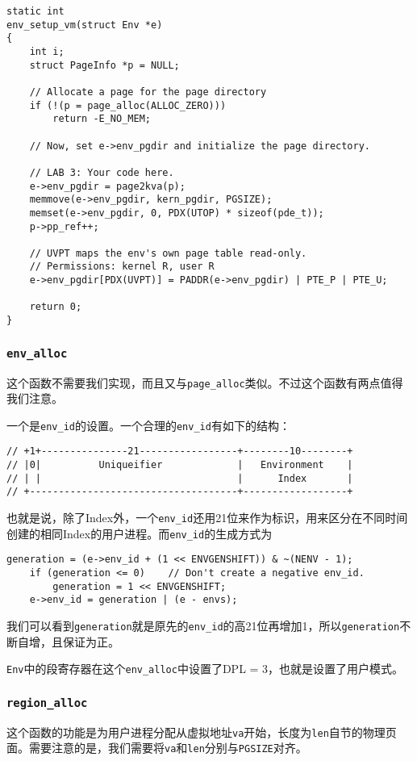 \documentclass[11pt]{article}
\begin{document}
\begin{lstlisting}[title=kern/env.c]
static int
env_setup_vm(struct Env *e)
{
	int i;
	struct PageInfo *p = NULL;

	// Allocate a page for the page directory
	if (!(p = page_alloc(ALLOC_ZERO)))
		return -E_NO_MEM;

	// Now, set e->env_pgdir and initialize the page directory.

	// LAB 3: Your code here.
	e->env_pgdir = page2kva(p);
	memmove(e->env_pgdir, kern_pgdir, PGSIZE);
	memset(e->env_pgdir, 0, PDX(UTOP) * sizeof(pde_t));
	p->pp_ref++;

	// UVPT maps the env's own page table read-only.
	// Permissions: kernel R, user R
	e->env_pgdir[PDX(UVPT)] = PADDR(e->env_pgdir) | PTE_P | PTE_U;

	return 0;
}
\end{lstlisting}

\subsubsection{\lstinline|env_alloc|}
这个函数不需要我们实现，而且又与\lstinline|page_alloc|类似。不过这个函数有两点值得我们注意。

一个是\lstinline|env_id|的设置。一个合理的\lstinline|env_id|有如下的结构：

\begin{lstlisting}[title=inc/env.h]
// +1+---------------21-----------------+--------10--------+
// |0|          Uniqueifier             |   Environment    |
// | |                                  |      Index       |
// +------------------------------------+------------------+
\end{lstlisting}
也就是说，除了Index外，一个\lstinline|env_id|还用21位来作为标识，用来区分在不同时间创建的相同Index的用户进程。而\lstinline|env_id|的生成方式为
\begin{lstlisting}[title=kern/env.c]
	generation = (e->env_id + (1 << ENVGENSHIFT)) & ~(NENV - 1);
	if (generation <= 0)	// Don't create a negative env_id.
		generation = 1 << ENVGENSHIFT;
	e->env_id = generation | (e - envs);
\end{lstlisting}
我们可以看到\lstinline|generation|就是原先的\lstinline|env_id|的高21位再增加1，所以\lstinline|generation|不断自增，且保证为正。

\lstinline|Env|中的段寄存器在这个\lstinline|env_alloc|中设置了DPL = 3，也就是设置了用户模式。

\subsubsection{\lstinline|region_alloc|}
这个函数的功能是为用户进程分配从虚拟地址\lstinline|va|开始，长度为\lstinline|len|自节的物理页面。需要注意的是，我们需要将\lstinline|va|和\lstinline|len|分别与\lstinline|PGSIZE|对齐。
\end{document}
